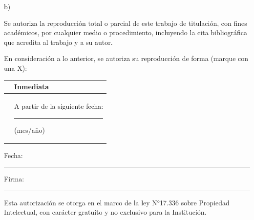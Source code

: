 \vspace{0.9cm}

\noindent b)
\hspace{1.0cm}
\begin{minipage}[t]{0.84\textwidth}
Se autoriza la reproducción total o parcial de este trabajo de titulación, con fines académicos, por cualquier medio o procedimiento, incluyendo la cita bibliográfica que acredita al trabajo y a su autor.

\vspace{0.35cm}

En consideración a lo anterior, se autoriza su reproducción de forma (marque con una X):
\end{minipage}

\vspace{0.25cm}

\noindent
\begin{tabular}{|p{2.2cm}|p{\dimexpr\textwidth-2.2cm-4\tabcolsep-3\arrayrulewidth}|}
\hline
& Inmediata \\ \hline
& A partir de la siguiente fecha: \rule{28mm}{0.1mm} (mes/año) \\ \hline
\end{tabular}

\vspace{0.85cm}

\hspace{1.55cm}
Fecha: \rule{36mm}{0.1mm}
\hspace{2.2cm}
Firma: \rule{55mm}{0.1mm}

\vfill

Esta autorización se otorga en el marco de la ley N°17.336 sobre Propiedad Intelectual, con carácter gratuito y no exclusivo para la Institución.

\restoregeometry
\endgroup
